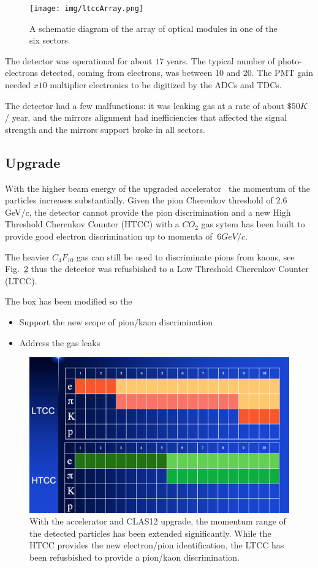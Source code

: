 \begin{figure}[hbt]
	\centering
	\texttt{[image: img/ltccArray.png]}
	\caption{A schematic diagram of the array of optical modules in one of the six sectors.}
	\label{fig:ltccArray}
\end{figure}

The detector was operational for about $17$ years. The typical number of photo-electrons detected, coming from electrons, was between 10 and 20.
The PMT gain needed $x10$ multiplier electronics to be digitized by the ADCs and TDCs.

The detector had a few malfunctions: it was leaking gas at a rate of about $\$50K$ / year, and the mirrors alignment had inefficiencies that affected
the signal strength and the mirrors support broke in all sectors.


\subsection{Upgrade}

With the higher beam energy of the upgraded accelerator~\cite{TDR12} the momentum of the particles increases substantially.
Given the pion Cherenkov threshold of $2.6$ GeV/c, the detector cannot provide the pion discrimination and a new
High Threshold Cherenkov Counter (HTCC) with a $CO_2$ gas sytem has been built to provide good electron discrimination up to momenta of $~6 GeV/c$.

The heavier $C_4F_{10}$ gas can still be used to discriminate pions from kaons, see Fig.~\ref{fig:newScope} thus the detector was refusbished
to a Low Threshold Cherenkov Counter (LTCC).

The box has been modified so the

\begin{itemize}
	\item Support the new scope of pion/kaon discrimination
	\item Address the gas leaks
\end{itemize}

\begin{figure}[hbt]
	\centering
	\includegraphics[width=1.0\columnwidth,keepaspectratio]{img/newScope.png}
	\caption{With the accelerator and CLAS12 upgrade, the momentum range of the detected particles has been extended significantly. While the HTCC
            provides the new electron/pion identification, the LTCC has been refusbished to provide a pion/kaon discrimination.}
	\label{fig:newScope}
\end{figure}
